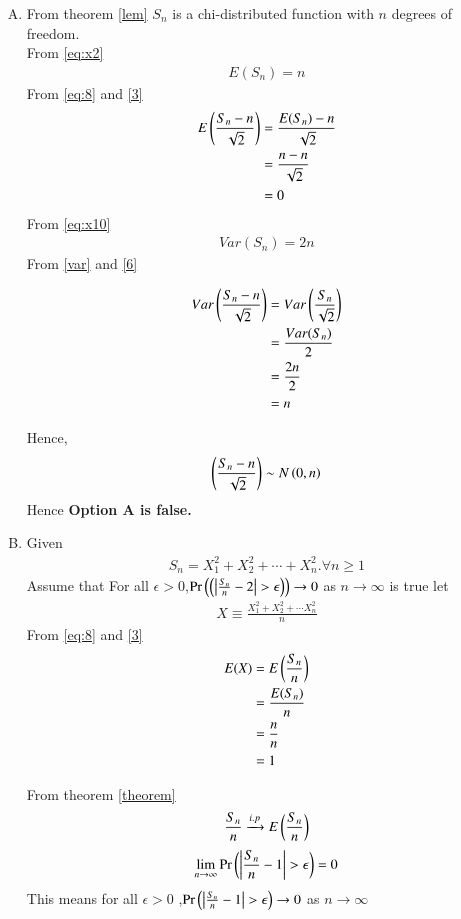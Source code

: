 \documentclass[journal,12pt,twocolumn]{IEEEtran}
\begin{document}
 \begin{enumerate}[(A)]
\item
From theorem \eqref{lem} $S_n$ is a chi-distributed function with $n$ degrees of freedom.\\
From \eqref{eq:x2} 
\begin{align}
    E(S_n)=n \label{eq:8}
\end{align}
From \eqref{eq:8} and \eqref{3}
\begin{align}
    E\left(\frac{S_{n}-n}{\sqrt{2}}\right)&=\frac{E(S_n)-n}{\sqrt{2}}\\
     &=\frac{n-n}{\sqrt{2}}\\
    &=0
\end{align}
From \eqref{eq:x10}
\begin{align}
    Var(S_n)= 2n\label{var}
\end{align}
From \eqref{var} and \eqref{6}

\begin{align}
    Var\left(\frac{S_{n}-n}{\sqrt{2}}\right)
    &= Var\left(\frac{S_n}{\sqrt{2}}\right)\\
    &=\frac{Var(S_n)}{2}\\
    &=\frac{2n}{2}\\
    &=n
\end{align}

Hence,
\begin{align}
    \left(\frac{S_{n}-n}{\sqrt{2}}\right)\sim N\left(0,n\right)
\end{align}
Hence \textbf{Option A is false.}



\item Given 
\begin{align}
    S_{n}=X_{1}^2+X_{2}^2+\cdots+X_{n}^2.\forall n\geq 1
\end{align}
Assume that For all $\epsilon > 0$,$\pr{\brak{\left|{\frac{S_n}{n}-2}\right|>\epsilon}}\to 0$ as $n \to \infty$ is true
let
\begin{align}
    X \equiv \frac{X_{1}^2+X_{2}^2+\cdots X_{n}^2}{n}
\end{align}
From \eqref{eq:8} and \eqref{3}
\begin{align}
    E(X)&=E\left(\frac{S_n}{n}\right)\\
        &=\frac{E(S_n)}{n}\\
        &=\frac{n}{n}\\
        &=1\label{25}
\end{align}

From theorem \eqref{theorem}
\begin{align}
    \frac{S_n}{n} \xrightarrow{i.p}  E\left(\frac{S_n}{n}\right)
\end{align}
\begin{align}
    \lim_{n \to \infty} \pr{\left|{\frac{S_n}{n}-1}\right|>\epsilon}=0
\end{align}
This means for all $\epsilon>0$ ,$\pr{\left|{\frac{S_n}{n}-1}\right|>\epsilon}\to 0$ as $n \to \infty$


\end{enumerate}
\end{document}
